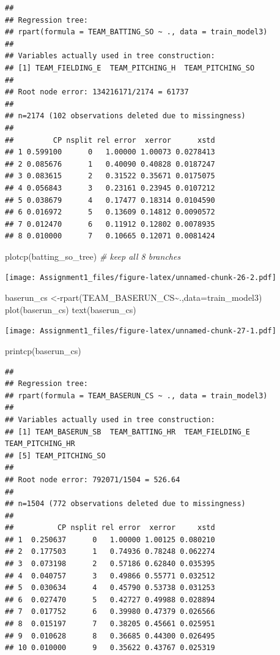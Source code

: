 \documentclass[
]{article}
\newenvironment{Shaded}{\begin{snugshade}}{\end{snugshade}}
\newcommand{\AttributeTok}[1]{\textcolor[rgb]{0.77,0.63,0.00}{#1}}
\newcommand{\CommentTok}[1]{\textcolor[rgb]{0.56,0.35,0.01}{\textit{#1}}}
\newcommand{\FunctionTok}[1]{\textcolor[rgb]{0.00,0.00,0.00}{#1}}
\newcommand{\NormalTok}[1]{#1}
\newcommand{\OtherTok}[1]{\textcolor[rgb]{0.56,0.35,0.01}{#1}}
\newcommand{\SpecialCharTok}[1]{\textcolor[rgb]{0.00,0.00,0.00}{#1}}
\begin{document}
\begin{verbatim}
## 
## Regression tree:
## rpart(formula = TEAM_BATTING_SO ~ ., data = train_model3)
## 
## Variables actually used in tree construction:
## [1] TEAM_FIELDING_E  TEAM_PITCHING_H  TEAM_PITCHING_SO
## 
## Root node error: 134216171/2174 = 61737
## 
## n=2174 (102 observations deleted due to missingness)
## 
##         CP nsplit rel error  xerror      xstd
## 1 0.599100      0   1.00000 1.00073 0.0278413
## 2 0.085676      1   0.40090 0.40828 0.0187247
## 3 0.083615      2   0.31522 0.35671 0.0175075
## 4 0.056843      3   0.23161 0.23945 0.0107212
## 5 0.038679      4   0.17477 0.18314 0.0104590
## 6 0.016972      5   0.13609 0.14812 0.0090572
## 7 0.012470      6   0.11912 0.12802 0.0078935
## 8 0.010000      7   0.10665 0.12071 0.0081424
\end{verbatim}

\begin{Shaded}
\begin{Highlighting}[]
\FunctionTok{plotcp}\NormalTok{(batting\_so\_tree) }\CommentTok{\# keep all 8 branches}
\end{Highlighting}
\end{Shaded}

\texttt{[image: Assignment1\_files/figure-latex/unnamed-chunk-26-2.pdf]}

\begin{Shaded}
\begin{Highlighting}[]
\NormalTok{baserun\_cs }\OtherTok{\textless{}{-}}\FunctionTok{rpart}\NormalTok{(TEAM\_BASERUN\_CS}\SpecialCharTok{\textasciitilde{}}\NormalTok{.,}\AttributeTok{data=}\NormalTok{train\_model3)}
\FunctionTok{plot}\NormalTok{(baserun\_cs)}
\FunctionTok{text}\NormalTok{(baserun\_cs)}
\end{Highlighting}
\end{Shaded}

\texttt{[image: Assignment1\_files/figure-latex/unnamed-chunk-27-1.pdf]}

\begin{Shaded}
\begin{Highlighting}[]
\FunctionTok{printcp}\NormalTok{(baserun\_cs)}
\end{Highlighting}
\end{Shaded}

\begin{verbatim}
## 
## Regression tree:
## rpart(formula = TEAM_BASERUN_CS ~ ., data = train_model3)
## 
## Variables actually used in tree construction:
## [1] TEAM_BASERUN_SB  TEAM_BATTING_HR  TEAM_FIELDING_E  TEAM_PITCHING_HR
## [5] TEAM_PITCHING_SO
## 
## Root node error: 792071/1504 = 526.64
## 
## n=1504 (772 observations deleted due to missingness)
## 
##          CP nsplit rel error  xerror     xstd
## 1  0.250637      0   1.00000 1.00125 0.080210
## 2  0.177503      1   0.74936 0.78248 0.062274
## 3  0.073198      2   0.57186 0.62840 0.035395
## 4  0.040757      3   0.49866 0.55771 0.032512
## 5  0.030634      4   0.45790 0.53738 0.031253
## 6  0.027470      5   0.42727 0.49988 0.028894
## 7  0.017752      6   0.39980 0.47379 0.026566
## 8  0.015197      7   0.38205 0.45661 0.025951
## 9  0.010628      8   0.36685 0.44300 0.026495
## 10 0.010000      9   0.35622 0.43767 0.025319
\end{verbatim}
\end{document}
